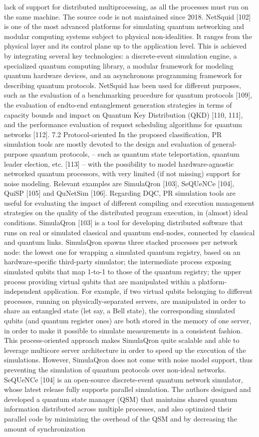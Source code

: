 lack of support for distributed multiprocessing, as all the processes must run on the same machine. The source code is not maintained since 2018. NetSquid [102] is one of the most advanced platforms for simulating quantum networking and modular computing systems subject to physical non-idealities. It ranges from the physical layer and its control plane up to the application level. This is achieved by integrating several key technologies: a discrete-event simulation engine, a specialized quantum computing library, a modular framework for modeling quantum hardware devices, and an asynchronous programming framework for describing quantum protocols. NetSquid has been used for different purposes, such as the evaluation of a benchmarking procedure for quantum protocols [109], the evaluation of endto-end entanglement generation strategies in terms of capacity bounds and impact on Quantum Key Distribution (QKD) [110, 111], and the performance evaluation of request scheduling algorithms for quantum networks [112]. 7.2 Protocol-oriented In the proposed classification, PR simulation tools are mostly devoted to the design and evaluation of general-purpose quantum protocols, – such as quantum state teleportation, quantum leader election, etc. [113] – with the possibility to model hardware-agnostic networked quantum processors, with very limited (if not missing) support for noise modeling. Relevant examples are SimulaQron [103], SeQUeNCe [104], QuiSP [105] and QuNetSim [106]. Regarding DQC, PR simulation tools are useful for evaluating the impact of different compiling and execution management strategies on the quality of the distributed program execution, in (almost) ideal conditions. SimulaQron [103] is a tool for developing distributed software that runs on real or simulated classical and quantum end-nodes, connected by classical and quantum links. SimulaQron spawns three stacked processes per network node: the lowest one for wrapping a simulated quantum registry, based on an hardware-specific third-party simulator; the intermediate process exposing simulated qubits that map 1-to-1 to those of the quantum registry; the upper process providing virtual qubits that are manipulated within a platform-independent application. For example, if two virtual qubits belonging to different processes, running on physically-separated servers, are manipulated in order to share an entangled state (let say, a Bell state), the corresponding simulated qubits (and quantum register ones) are both stored in the memory of one server, in order to make it possible to simulate measurements in a consistent fashion. This process-oriented approach makes SimulaQron quite scalable and able to leverage multicore server architecture in order to speed up the execution of the simulations. However, SimulaQron does not come with noise model support, thus preventing the simulation of quantum protocols over non-ideal networks. SeQUeNCe [104] is an open-source discrete-event quantum network simulator, whose latest release fully supports parallel simulation. The authors designed and developed a quantum state manager (QSM) that maintains shared quantum information distributed across multiple processes, and also optimized their parallel code by minimizing the overhead of the QSM and by decreasing the amount of synchronization 